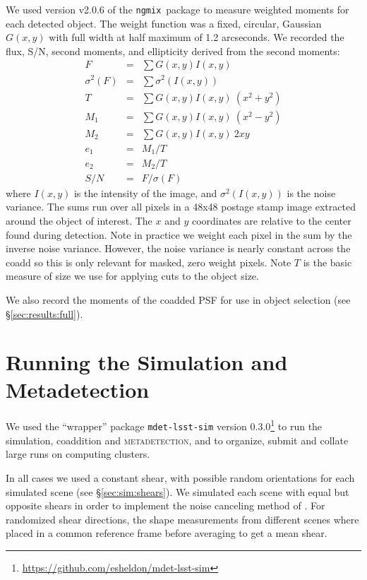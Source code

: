 \documentclass[iop, twocolappendix, appendixfloats, numberedappendix, apj]{hackemulateapj}
\newcommand{\ngmix}{\texttt{ngmix}}
\newcommand{\mdet}{\textsc{metadetection}}
\begin{document}
We used version v2.0.6 of the \ngmix\ package to measure weighted moments for
each detected object. The weight function was a fixed, circular, Gaussian $G(x,
y)$ with full width at half maximum of 1.2 arcseconds.  We recorded the flux,
S/N, second moments, and ellipticity derived from the second moments:
\begin{eqnarray} \label{eq:moments}
    F &=& \sum G(x, y) I(x, y) \\
    \sigma^2(F) &=& \sum \sigma^2(I(x, y)) \\
    T &=& \sum G(x, y) I(x, y) ~ (x^2 + y^2) \\
    M_1 &=& \sum G(x, y) I(x, y) ~ (x^2 - y^2) \\
    M_2 &=& \sum G(x, y) I(x, y) ~ 2 x y \\
    e_1 &=& M_1 / T \\
    e_2 &=& M_2 / T \\
    S/N &=& F / \sigma(F)
\end{eqnarray}
where $I(x, y)$ is the intensity of the image, and $\sigma^2(I(x, y))$ is the
noise variance. The sums run over all pixels in a 48x48 postage stamp image
extracted around the object of interest.  The $x$ and $y$ coordinates are
relative to the center found during detection.  Note in practice we weight each
pixel in the sum by the inverse noise variance. However, the noise variance is
nearly constant across the coadd so this is only relevant for masked, zero
weight pixels.  Note $T$ is the basic measure of size we use for applying
cuts to the object size.

We also record the moments of the coadded PSF for use in object selection (see
\S \ref{sec:results:full}).


\section{Running the Simulation and Metadetection} \label{sec:timing}

We used the ``wrapper'' package \texttt{mdet-lsst-sim} version
0.3.0\footnote{\url{https://github.com/esheldon/mdet-lsst-sim}} to run the
simulation, coaddition and \mdet, and to organize, submit and collate large
runs on computing clusters.

In all cases we used a constant shear, with possible random orientations for
each simulated scene (see \S \ref{sec:sim:shears}).  We simulated each scene
with equal but opposite shears in order to implement the noise canceling method
of \citep{pujol2019}.  For randomized shear directions, the shape measurements
from different scenes where placed in a common reference frame before averaging
to get a mean shear.
\end{document}
